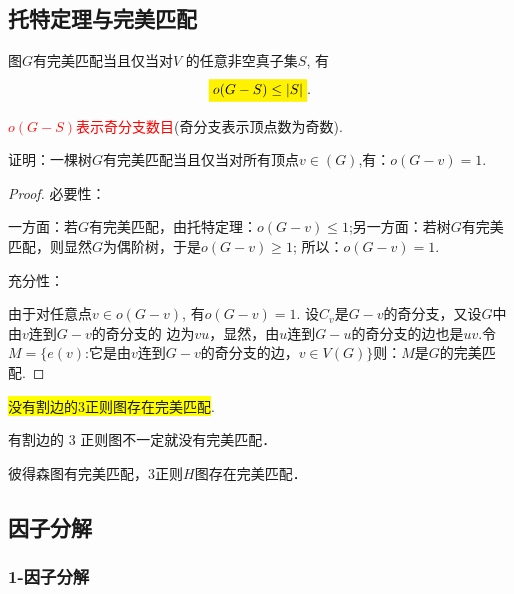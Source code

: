 \subsection{托特定理与完美匹配}
\begin{theorem}[托特，1947]
	图$G$有完美匹配当且仅当对$V$
	的任意非空真子集$S$, 有
	\[
	\colorbox{yellow}{$o(G-S)\leq |S|$}.
	\]
\end{theorem}
\begin{note}
	\textcolor{red}{ $o(G-S)$表示奇分支数目}(奇分支表示顶点数为奇数).
\end{note}
\begin{example}
	证明：一棵树$G$有完美匹配当且仅当对所有顶点$v
	\in (G)$,有：$o(G-v)=1$.
\end{example}
\begin{proof}
\noindent 必要性：

一方面：若$G$有完美匹配，由托特定理：$o(G-v)\leq1$;另一方面：若树$G$有完美匹配，则显然$G$为偶阶树，于是$o(G-v)\geq1$; 所以：$o(G-v)=1$.

\noindent 充分性：

由于对任意点$v \in o(G-v)$, 有$o(G-v)=1$. 设$C_v$是$G-v$的奇分支，又设$G$中由$v$连到$G-v$的奇分支的
边为$vu$，显然，由$u$连到$G-u$的奇分支的边也是$uv$.令$M=\{e(v)$:它是由$v$连到$G-v$的奇分支的边，$v \in V(G) \}$则：$M$是$G$的完美匹配.
\end{proof}











\begin{corollary}[彼得森]
	\colorbox{yellow}{没有割边的3正则图存在完美匹配}.
\end{corollary}
\begin{note}
	有割边的 3 正则图不一定就没有完美匹配．
	
	彼得森图有完美匹配，3正则$H$图存在完美匹配．
\end{note}

\subsection{因子分解}
\subsubsection{1-因子分解}

